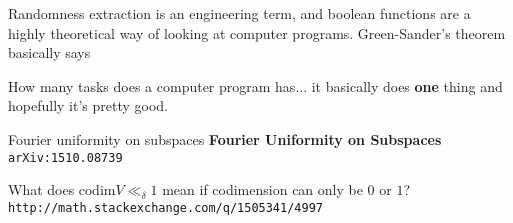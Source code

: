 \documentclass[12pt]{article}
\begin{document}
Randomness extraction is an engineering term, and boolean functions are a highly theoretical way of looking at computer programs.  Green-Sander's theorem basically says \newline

\textbf{\color{orange}{any computer program over a data stream is essentially a line (or hyperplane)}} \newline

How many tasks does a computer program has... it basically does \textbf{one} thing and hopefully it's pretty good.
\newpage

\selectfont \fontsize{12}{10}\selectfont

\begin{thebibliography}{}

\item Fourier uniformity on subspaces \textbf{Fourier Uniformity on Subspaces} \texttt{arXiv:1510.08739}

\item What does $\mathrm{codim} V \ll_\delta 1$ mean if codimension can only be $0$ or $1$? \texttt{http://math.stackexchange.com/q/1505341/4997}



\end{thebibliography}
\end{document}
